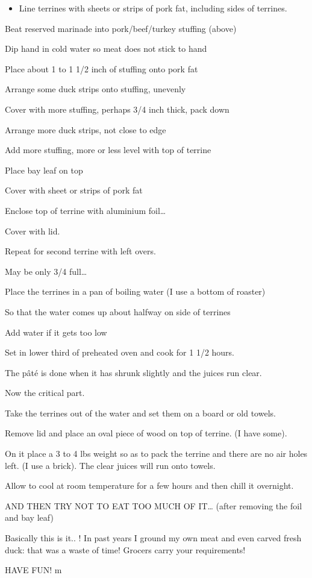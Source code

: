 \documentclass[twocolumn]{article}
\providecommand{\tightlist}{%
  \setlength{\itemsep}{0pt}\setlength{\parskip}{0pt}}
\begin{document}
\begin{itemize}
\tightlist
\item
  Line terrines with sheets or strips of pork fat, including sides of
  terrines.
\end{itemize}

Beat reserved marinade into pork/beef/turkey stuffing (above)

Dip hand in cold water so meat does not stick to hand

Place about 1 to 1 1/2 inch of stuffing onto pork fat

Arrange some duck strips onto stuffing, unevenly

Cover with more stuffing, perhaps 3/4 inch thick, pack down

Arrange more duck strips, not close to edge

Add more stuffing, more or less level with top of terrine

Place bay leaf on top

Cover with sheet or strips of pork fat

Enclose top of terrine with aluminium foil\ldots{}

Cover with lid.

Repeat for second terrine with left overs.

May be only 3/4 full\ldots{}

Place the terrines in a pan of boiling water (I use a bottom of roaster)

So that the water comes up about halfway on side of terrines

Add water if it gets too low

Set in lower third of preheated oven and cook for 1 1/2 hours.

The pâté is done when it has shrunk slightly and the juices run clear.

Now the critical part.

Take the terrines out of the water and set them on a board or old
towels.

Remove lid and place an oval piece of wood on top of terrine. (I have
some).

On it place a 3 to 4 lbs weight so as to pack the terrine and there are
no air holes left. (I use a brick). The clear juices will run onto
towels.

Allow to cool at room temperature for a few hours and then chill it
overnight.

AND THEN TRY NOT TO EAT TOO MUCH OF IT\ldots{} (after removing the foil
and bay leaf)

Basically this is it.. ! In past years I ground my own meat and even
carved fresh duck: that was a waste of time! Grocers carry your
requirements!

HAVE FUN! m
\end{document}

